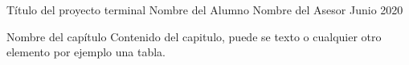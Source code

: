 \documentclass{./class/pt}
\begin{document}
    \portadaTSI
        {Título del proyecto terminal}
        {Nombre del Alumno}
        {Nombre del Asesor}
        {Junio 2020}


    \capituloPt
        {Nombre del capítulo}
        {
            Contenido del capitulo, puede se texto o cualquier otro elemento
            por ejemplo una tabla.
        }
\end{document}
